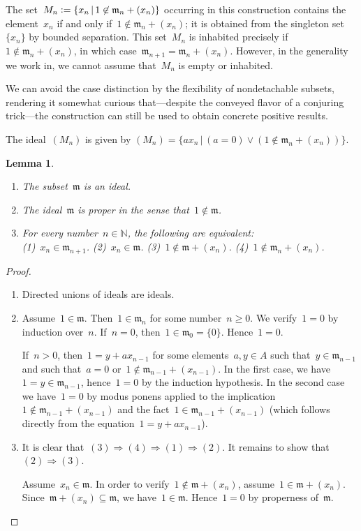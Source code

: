 \documentclass[com,11pt,crcready]{iosart2x}
\theoremstyle{definition}
\theoremstyle{plain}
\newtheorem{lemma}[definition]{Lemma}
\theoremstyle{remark}
\newcommand{\mmm}{\mathfrak{m}}
\newcommand{\NN}{\mathbb{N}}
\newcommand{\defeq}{\vcentcolon=}
\renewcommand{\_}{\mathpunct{.}\,}
\begin{document}
The set~$M_n \defeq \{ x_n \,|\, 1 \not\in \mmm_n + (x_n) \}$ occurring in this
construction contains the element~$x_n$ if and only if~$1 \not\in \mmm_n +
(x_n)$; it is obtained from the singleton set~$\{x_n\}$ by bounded separation.
This set~$M_n$ is inhabited precisely if~$1 \not\in \mmm_n + (x_n)$, in which case~$\mmm_{n+1} = \mmm_n + (x_n)$.
However, in the generality we work in, we cannot assume that~$M_n$ is empty or
inhabited.

We can avoid the case distinction by the flexibility of nondetachable
subsets, rendering it somewhat curious that---despite the conveyed flavor of a
conjuring trick---the construction can still be used to obtain concrete
positive results.

The ideal~$(M_n)$ is given by
$(M_n) = \{ a x_n \,|\, (a = 0) \vee (1 \not\in \mmm_n + (x_n)) \}$.

\begin{lemma}\label{lemma:omnibus}
\begin{enumerate}
\item[\textnormal{(a)}] The subset~$\mmm$ is an ideal.
\item[\textnormal{(b)}] The ideal~$\mmm$ is \emph{proper} in the sense that~$1 \not\in \mmm$.
\item[\textnormal{(c)}] For every number~$n \in \NN$, the following are equivalent: \\
(1)~$x_n \in \mmm_{n+1}$.\quad
(2)~$x_n \in \mmm$.\quad
(3)~$1 \not\in \mmm + (x_n)$.\quad
(4)~$1 \not\in \mmm_n + (x_n)$.
\end{enumerate}
\end{lemma}

\begin{proof}\begin{enumerate}
\item[(a)] Directed unions of ideals are ideals.
\item[(b)] Assume~$1 \in \mmm$. Then~$1 \in \mmm_n$ for some number~$n \geq 0$. We
verify~$1 = 0$ by induction over~$n$.
If~$n = 0$, then~$1 \in \mmm_0 = \{0\}$. Hence~$1 = 0$.

If~$n > 0$, then~$1 = y + a x_{n-1}$ for some elements~$a,y \in A$ such that~$y
\in \mmm_{n-1}$ and such that~$a = 0$ or~$1 \not\in \mmm_{n-1} + (x_{n-1})$.
In the first case, we have~$1 = y \in \mmm_{n-1}$, hence~$1 = 0$ by the induction
hypothesis. In the second case we have~$1 = 0$ by modus ponens applied to the
implication~$1 \not\in \mmm_{n-1} + (x_{n-1})$ and the fact~$1 \in \mmm_{n-1} +
(x_{n-1})$ (which follows directly from the equation~$1 = y + a x_{n-1}$).
\item[(c)] It is clear that~$(3) \Rightarrow (4) \Rightarrow (1) \Rightarrow
(2)$. It remains to show that~$(2) \Rightarrow (3)$.

Assume~$x_n \in \mmm$. In order to verify~$1 \not\in \mmm + (x_n)$,
assume~$1 \in \mmm + (x_n)$. Since~$\mmm + (x_n) \subseteq \mmm$,
we have~$1 \in \mmm$. Hence~$1 = 0$ by properness of~$\mmm$.\qedhere
\end{enumerate}\end{proof}
\end{document}
